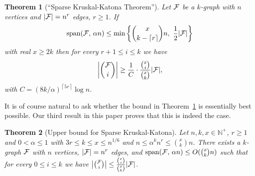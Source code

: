 \documentclass[11pt]{article}
\newtheorem{theo}{Theorem}[section]
\newcommand{\FF}{{\cal F}}
\newcommand{\ceil}[1]{\left\lceil #1 \right\rceil}
\renewcommand{\wp}{\mathrm{span}}
\renewcommand{\a}{\alpha}
\newcommand{\sub}{\subseteq}
\newcommand{\N}{\mathbb{N}}
\begin{document}
%
%


\begin{theo}[``Sparse Kruskal-Katona Theorem'']\label{th:skk-intro}
	Let $\FF$ be a $k$-graph with $n$ vertices and $|\FF|=n^r$ edges, $r \ge 1$. 
	If 
	$$\wp(\FF,\,\a n) \le \min\bigg\{\binom{x}{k-\ceil{r}}n, \,\, \frac{1}{2}|\FF|\bigg\}$$
	with real $x \ge 2k$ then for every $r+1 \le i \le k$ we have 
	$$\bigg|\binom{\FF}{i}\bigg| \ge \frac{1}{C}\cdot \frac{\binom{x}{i}}{\binom{x}{k}}|\FF|,$$
	with $C = (8k/\a)^{\ceil{5r}}\log n$.
\end{theo}


It is of course natural to ask whether the bound in Theorem~\ref{th:skk-intro} is essentially best possible.
Our third result in this paper proves that this is indeed the case.

\begin{theo}[Upper bound for Sparse Kruskal-Katona]\label{theo:sKK-UB-intro}
	Let $n,k,x \in \N^+$, $r \ge 1$ and $0 < \a \le 1$ with 
	$3r \le k \le x \le n^{1/6}$
	and $n \le \a^k n^r \le \binom{x}{k}n$.
	There exists a $k$-graph $\FF$ with $n$ vertices, $|\FF|=n^r$ edges, 
	and 
	$\wp(\FF,\,\a n) \le O(\binom{x}{k}n)$
	such that for every $0 \le i \le k$ we have 
	$\big|\binom{\FF}{i}\big| \le \frac{\binom{x}{i}}{\binom{x}{k}}|\FF|$.
\end{theo} 
\end{document}
